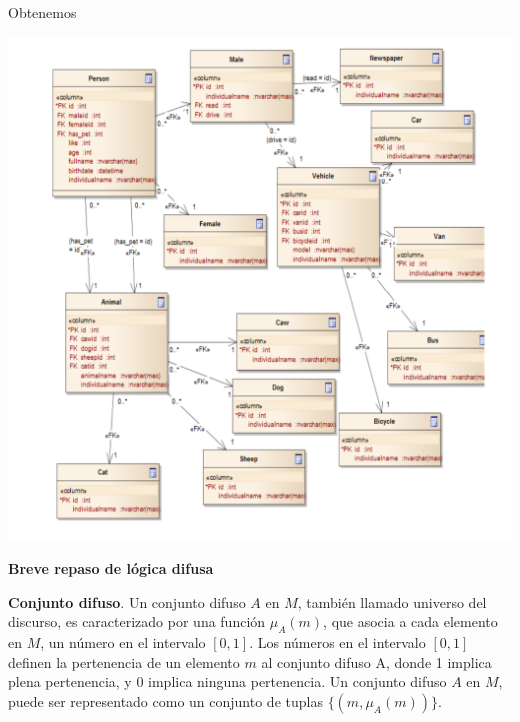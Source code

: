 \documentclass{fancyslides}
\begin{document}
\begin{frame}
\misc
{

\justifying Obtenemos

\begin{center}
\includegraphics[scale=0.15]{owl2dw}
\end{center}

}
\end{frame}


\begin{frame}
\end{frame}

\begin{frame}
\misc
{ \textbf{Breve repaso de lógica difusa}
\newline

\justifying \textbf{Conjunto difuso}. Un conjunto difuso $A$ en $M$, también llamado universo del discurso, es caracterizado por una función
$\mu_{A}(m)$, que asocia a cada elemento en $M$, un número en el intervalo $[0,1]$. Los números en el intervalo $[0,1]$ definen la pertenencia
de un elemento $m$ al conjunto difuso A, donde 1 implica plena pertenencia, y 0 implica ninguna pertenencia.
Un conjunto difuso $A$ en $M$, puede ser representado como un conjunto de tuplas $\{ (m, \mu_{A}(m))\}$.

}
\end{frame}
\end{document}
